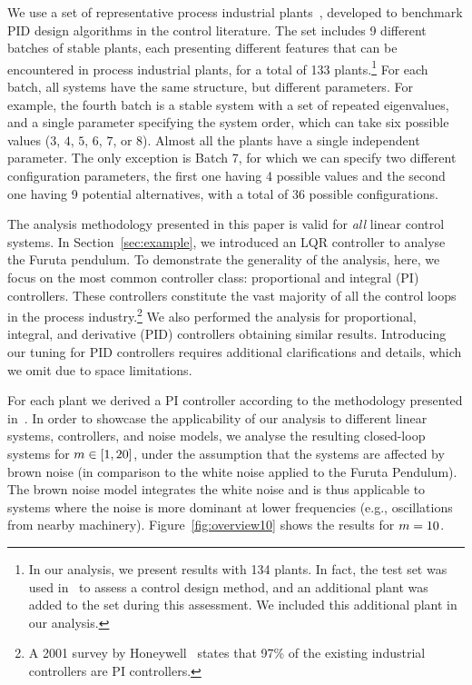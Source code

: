 We use a set of representative process industrial plants~\cite{Astrom:2004}, developed to benchmark PID design algorithms in the control literature.
The set includes 9 different batches of stable plants, each presenting different features that can be encountered in process industrial plants, for a total of 133 plants.\footnote{%
In our analysis, we present results with 134 plants. In fact, the test set was used in~\cite{Garpinger:2015} to assess a control design method, and an additional plant was added to the set during this assessment. We included this additional plant in our analysis.}
For each batch, all systems have the same structure, but different parameters.
For example, the fourth batch is a stable system with a set of repeated eigenvalues, and a single parameter specifying the system order, which can take six possible values ($3$, $4$, $5$, $6$, $7$, or $8$).
Almost all the plants have a single independent parameter.
The only exception is Batch 7, for which we can specify two different configuration parameters, the first one having 4 possible values and the second one having 9 potential alternatives, with a total of 36 possible configurations.

The analysis methodology presented in this paper is valid for \emph{all} linear control systems.
In Section~\ref{sec:example}, we introduced an LQR controller to analyse the Furuta pendulum. To demonstrate the generality of the analysis, here, we focus on the most common controller class: proportional and integral (PI) controllers. 
These controllers constitute the vast majority of all the control loops in the process industry.\footnote{A 2001 survey by Honeywell~\cite{Desborough2001} states that 97\% of the existing industrial controllers are PI controllers.}
We also performed the analysis for proportional, integral, and derivative (PID) controllers obtaining similar results.
Introducing our tuning for PID controllers requires additional clarifications and details, which we omit due to space limitations.

For each plant we derived a PI controller according to the methodology presented in~\cite{Garpinger:2015}.
In order to showcase the applicability of our analysis to different linear systems, controllers, and noise models, we analyse the resulting closed-loop systems for $m \in [1,20]$, under the assumption that the systems are affected by brown noise (in comparison to the white noise applied to the Furuta Pendulum).
The brown noise model integrates the white noise and is thus applicable to systems where the noise is more dominant at lower frequencies (e.g., oscillations from nearby machinery).
Figure~\ref{fig:overview10} shows the results for $m=10$.

